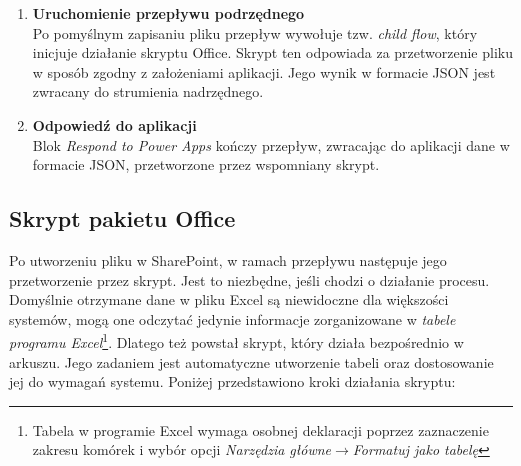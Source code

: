\begin{enumerate}
    \item \textbf{Uruchomienie przepływu podrzędnego} \\
    Po pomyślnym zapisaniu pliku przepływ wywołuje tzw. \textit{child flow}, który inicjuje działanie skryptu Office. Skrypt ten odpowiada za przetworzenie pliku w sposób zgodny z założeniami aplikacji. Jego wynik w formacie JSON jest zwracany do strumienia nadrzędnego. 

    \item \textbf{Odpowiedź do aplikacji} \\
    Blok \textit{Respond to Power Apps} kończy przepływ, zwracając do aplikacji dane w formacie JSON, przetworzone przez wspomniany skrypt.
\end{enumerate}

\subsection{Skrypt pakietu Office}
Po utworzeniu pliku w SharePoint, w ramach przepływu następuje jego przetworzenie przez skrypt. Jest to niezbędne, jeśli chodzi o działanie procesu. Domyślnie otrzymane dane w pliku Excel są niewidoczne dla większości systemów, mogą one odczytać jedynie informacje zorganizowane w \emph{tabele programu Excel}\footnote{Tabela w programie Excel wymaga osobnej deklaracji poprzez zaznaczenie zakresu komórek i wybór opcji \emph{Narzędzia główne}$\to$\emph{Formatuj jako tabelę}}. Dlatego też powstał skrypt, który działa bezpośrednio w arkuszu. Jego zadaniem jest automatyczne utworzenie tabeli oraz dostosowanie jej do wymagań systemu. Poniżej przedstawiono kroki działania skryptu:

